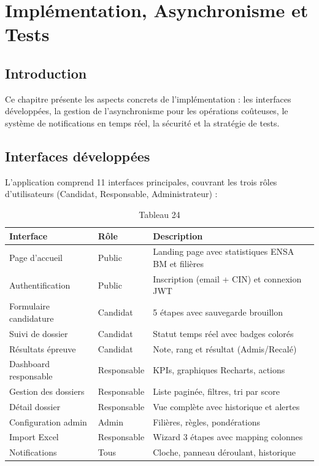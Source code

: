 \chapter{Implémentation, Asynchronisme et Tests}

\section{Introduction}

Ce chapitre présente les aspects concrets de l'implémentation : les interfaces développées, la gestion de l'asynchronisme pour les opérations coûteuses, le système de notifications en temps réel, la sécurité et la stratégie de tests.

\section{Interfaces développées}

L'application comprend 11 interfaces principales, couvrant les trois rôles d'utilisateurs (Candidat, Responsable, Administrateur) :

\begin{table}[htbp]
\centering
\begin{tabular}{|l|l|l|}
\hline
Interface & Rôle & Description \\
\hline
Page d'accueil & Public & Landing page avec statistiques ENSA BM et filières \\
\hline
Authentification & Public & Inscription (email + CIN) et connexion JWT \\
\hline
Formulaire candidature & Candidat & 5 étapes avec sauvegarde brouillon \\
\hline
Suivi de dossier & Candidat & Statut temps réel avec badges colorés \\
\hline
Résultats épreuve & Candidat & Note, rang et résultat (Admis/Recalé) \\
\hline
Dashboard responsable & Responsable & KPIs, graphiques Recharts, actions \\
\hline
Gestion des dossiers & Responsable & Liste paginée, filtres, tri par score \\
\hline
Détail dossier & Responsable & Vue complète avec historique et alertes \\
\hline
Configuration admin & Admin & Filières, règles, pondérations \\
\hline
Import Excel & Responsable & Wizard 3 étapes avec mapping colonnes \\
\hline
Notifications & Tous & Cloche, panneau déroulant, historique \\
\hline
\end{tabular}
\caption{Tableau 24}
\label{tab:table_24}
\end{table}

